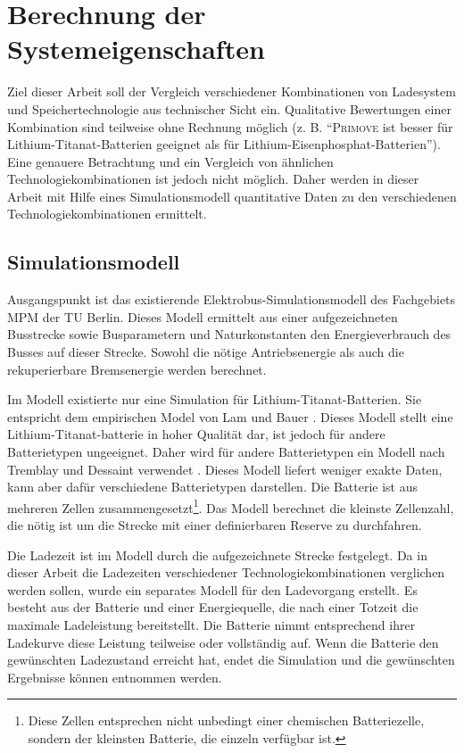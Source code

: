 \chapter{Berechnung der Systemeigenschaften}
Ziel dieser Arbeit soll der Vergleich verschiedener Kombinationen von Ladesystem und Speichertechnologie aus technischer Sicht ein. Qualitative Bewertungen einer Kombination sind teilweise ohne Rechnung möglich (z. B. "`\textsc{Primove} ist besser für Lithium-Titanat-Batterien geeignet als für Lithium-Eisenphosphat-Batterien"'). Eine genauere Betrachtung und ein Vergleich von ähnlichen Technologiekombinationen ist jedoch nicht möglich. Daher werden in dieser Arbeit mit Hilfe eines Simulationsmodell quantitative Daten zu den verschiedenen Technologiekombinationen ermittelt.

\section{Simulationsmodell}
 Ausgangspunkt ist das existierende Elektrobus-Simulationsmodell des Fachgebiets MPM der TU Berlin. Dieses Modell ermittelt aus einer aufgezeichneten Busstrecke sowie Busparametern und Naturkonstanten den Energieverbrauch des Busses auf dieser Strecke. Sowohl die nötige Antriebsenergie als auch die rekuperierbare Bremsenergie werden berechnet.

Im Modell existierte nur eine Simulation für Lithium-Titanat-Batterien. Sie entspricht dem empirischen Model von Lam und Bauer \cite{lam2011practical}. Dieses Modell stellt eine Lithium-Titanat-batterie in hoher Qualität dar, ist jedoch für andere Batterietypen ungeeignet. Daher wird für andere Batterietypen ein Modell nach Tremblay und Dessaint verwendet \cite{tremblay2009experimental}. Dieses Modell liefert weniger exakte Daten, kann aber dafür verschiedene Batterietypen darstellen. Die Batterie ist aus mehreren Zellen zusammengesetzt\footnote{Diese Zellen entsprechen nicht unbedingt einer chemischen Batteriezelle, sondern der kleinsten Batterie, die einzeln verfügbar ist.}. Das Modell berechnet die kleinste Zellenzahl, die nötig ist um die Strecke mit einer definierbaren Reserve zu durchfahren.

Die Ladezeit ist im Modell durch die aufgezeichnete Strecke festgelegt. Da in dieser Arbeit die Ladezeiten verschiedener Technologiekombinationen verglichen werden sollen, wurde ein separates Modell für den Ladevorgang erstellt. Es besteht aus der Batterie und einer Energiequelle, die nach einer Totzeit die maximale Ladeleistung bereitstellt. Die Batterie nimmt entsprechend ihrer Ladekurve diese Leistung teilweise oder vollständig auf. Wenn die Batterie den gewünschten Ladezustand erreicht hat, endet die Simulation und die gewünschten Ergebnisse können entnommen werden.


